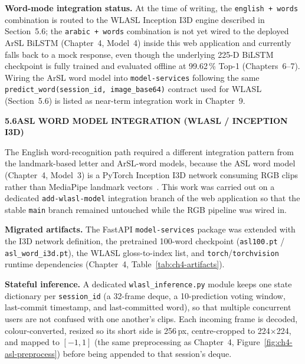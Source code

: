 \noindent\textbf{Word-mode integration status.} At the time of writing, the \texttt{english + words} combination is routed to the WLASL Inception I3D engine described in Section~5.6; the \texttt{arabic + words} combination is not yet wired to the deployed ArSL BiLSTM (Chapter~4, Model~4) inside this web application and currently falls back to a mock response, even though the underlying 225-D BiLSTM checkpoint is fully trained and evaluated offline at 99.62\,\% Top-1 (Chapters~6--7). Wiring the ArSL word model into \texttt{model-services} following the same \texttt{predict\_word(session\_id, image\_base64)} contract used for WLASL (Section~5.6) is listed as near-term integration work in Chapter~9.\par\vspace{0.3cm}

\noindent\textbf{5.6\quad ASL WORD MODEL INTEGRATION (WLASL / INCEPTION I3D)}\par
{}
\vspace{0.2cm}

\noindent The English word-recognition path required a different integration pattern from the landmark-based letter and ArSL-word models, because the ASL word model (Chapter~4, Model~3) is a PyTorch Inception I3D network consuming RGB clips rather than MediaPipe landmark vectors~\cite{carreira2017i3d,pytorch2024,li2020wlasl}. This work was carried out on a dedicated \texttt{add-wlasl-model} integration branch of the web application so that the stable \texttt{main} branch remained untouched while the RGB pipeline was wired in.\par\vspace{0.2cm}

\noindent\textbf{Migrated artifacts.} The FastAPI \texttt{model-services} package was extended with the I3D network definition, the pretrained 100-word checkpoint (\texttt{asl100.pt} / \texttt{asl\_word\_i3d.pt}), the WLASL gloss-to-index list, and \texttt{torch}/\texttt{torchvision} runtime dependencies (Chapter~4, Table~\ref{tab:ch4-artifacts}).\par\vspace{0.2cm}

\noindent\textbf{Stateful inference.} A dedicated \texttt{wlasl\_inference.py} module keeps one state dictionary per \texttt{session\_id} (a 32-frame deque, a 10-prediction voting window, last-commit timestamp, and last-committed word), so that multiple concurrent users are not confused with one another's clips. Each incoming frame is decoded, colour-converted, resized so its short side is 256\,px, centre-cropped to 224$\times$224, and mapped to $[-1,1]$ (the same preprocessing as Chapter~4, Figure~\ref{fig:ch4-asl-preprocess}) before being appended to that session's deque. 


